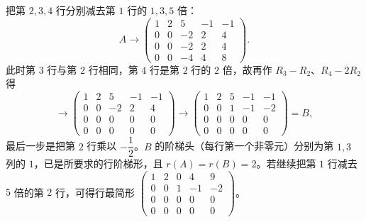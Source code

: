 \begin{solution}
把第 $2,3,4$ 行分别减去第 $1$ 行的 $1,3,5$ 倍：
\[
A\to\begin{pmatrix}1&2&5&-1&-1\\0&0&-2&2&4\\0&0&-2&2&4\\0&0&-4&4&8\end{pmatrix}.
\]
此时第 $3$ 行与第 $2$ 行相同，第 $4$ 行是第 $2$ 行的 $2$ 倍，故再作 $R_3-R_2$、$R_4-2R_2$ 得
\[
\to\begin{pmatrix}1&2&5&-1&-1\\0&0&-2&2&4\\0&0&0&0&0\\0&0&0&0&0\end{pmatrix}
\to\begin{pmatrix}1&2&5&-1&-1\\0&0&1&-1&-2\\0&0&0&0&0\\0&0&0&0&0\end{pmatrix}=B,
\]
最后一步是把第 $2$ 行乘以 $-\dfrac12$。$B$ 的阶梯头（每行第一个非零元）分别为第 $1,3$ 列的 $1$，已是所要求的行阶梯形，且 $r(A)=r(B)=2$。若继续把第 $1$ 行减去 $5$ 倍的第 $2$ 行，可得行最简形
$\begin{pmatrix}1&2&0&4&9\\0&0&1&-1&-2\\0&0&0&0&0\\0&0&0&0&0\end{pmatrix}$。
\end{solution}

